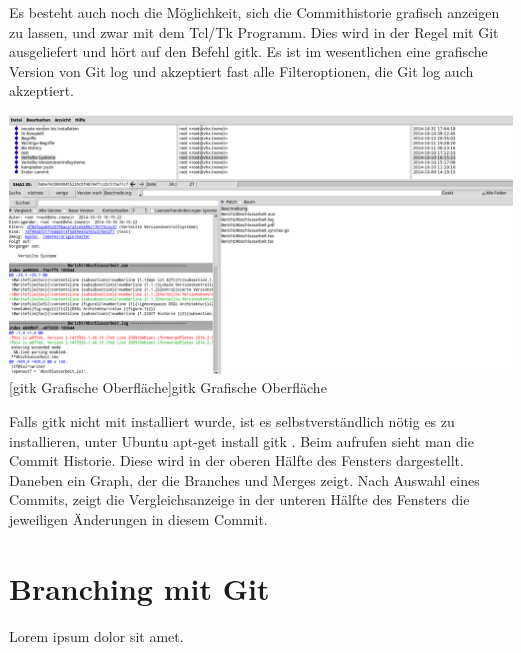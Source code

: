 \documentclass[12pt,a4paper,bibliography=totocnumbered,listof=totocnumbered]{scrartcl}
\begin{document}
Es besteht auch noch die Möglichkeit, sich die Commithistorie grafisch anzeigen zu lassen, und zwar mit dem Tcl/Tk Programm.
Dies wird in der Regel mit Git ausgeliefert und hört auf den Befehl gitk. Es ist im wesentlichen eine grafische Version von Git log und akzeptiert fast alle Filteroptionen, die Git log auch akzeptiert.

\vspace{3pt}
\begin{minipage}{\linewidth}
	\centering
	\includegraphics[width=0.9\linewidth]{Bilder/gitk.png}
	[gitk Grafische Oberfläche]{gitk Grafische Oberfläche}
	\label{fig:osgi}
\end{minipage}

Falls gitk nicht mit installiert wurde, ist es selbstverständlich nötig es zu installieren, unter Ubuntu apt-get install gitk .
Beim aufrufen sieht man die Commit Historie. Diese wird in der oberen Hälfte des Fensters dargestellt. Daneben ein Graph, der die Branches und Merges zeigt. Nach Auswahl eines Commits, zeigt die Vergleichsanzeige in der unteren Hälfte des Fensters die jeweiligen Änderungen in diesem Commit.
\newpage


\section{Branching mit Git}
Lorem ipsum dolor sit amet.
\end{document}

